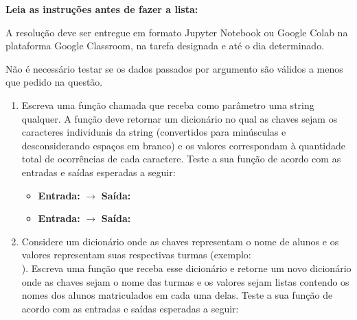 
\vspace{1cm}

\noindent  \textbf{Leia as instruções antes de fazer a lista:}

\vspace{0.3cm}
\noindent A resolução deve ser entregue em formato Jupyter Notebook ou Google Colab na plataforma Google Classroom, na tarefa designada e até o dia determinado.

\noindent  Não é necessário testar se os dados passados por argumento são válidos a menos que pedido na questão.


\vspace{0.5cm}


\begin{enumerate}[label=\textbf{Q\arabic*.}]

\item Escreva uma função chamada  que receba como parâmetro uma string qualquer. A função deve retornar um dicionário no qual as chaves sejam os caracteres individuais da string (convertidos para minúsculas e desconsiderando espaços em branco) e os valores correspondam à quantidade total de ocorrências de cada caractere. Teste a sua função de acordo com as entradas e saídas esperadas a seguir:

\begin{itemize}
    \item \textbf{Entrada:}  $\rightarrow$ \textbf{Saída:} 
    \item \textbf{Entrada:}  $\rightarrow$ \textbf{Saída:} \\
\end{itemize}





\item Considere um dicionário onde as chaves representam o nome de alunos e os valores representam suas respectivas turmas (exemplo: \\). Escreva uma função  que receba esse dicionário e retorne um novo dicionário onde as chaves sejam o nome das turmas e os valores sejam listas contendo os nomes dos alunos matriculados em cada uma delas. Teste a sua função de acordo com as entradas e saídas esperadas a seguir:


\end{enumerate}
